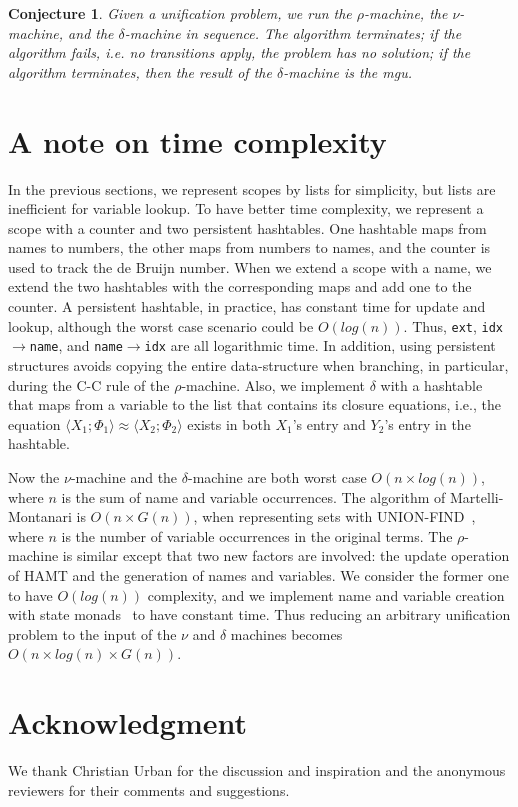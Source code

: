 \documentclass{easychair}
\newtheorem{conj}{Conjecture}[section]
\newcommand{\clos}[2] {
\langle #1; #2 \rangle
}
\newcommand{\aeq}[4] {
\clos{#1}{#2} \approx \clos{#3}{#4}
}
\newcommand*{\transname}[1]{\textsc{#1}}
\begin{document}
\begin{conj}\label{lemma:rmachine}
  Given a unification problem, we run the $\rho$-machine,
  the $\nu$-machine, and the $\delta$-machine in sequence.
  The algorithm terminates;
  if the algorithm fails, i.e. no transitions apply,
  the problem has no solution;
  if the algorithm terminates, then the result of the $\delta$-machine
  is the mgu.
\end{conj}

\section{A note on time complexity}
\label{efficiency}

In the previous sections, we represent scopes by lists for simplicity,
but lists are inefficient for variable lookup. To have better time
complexity, we represent a scope with a counter and two persistent
hashtables. One
hashtable maps from names to numbers, the other maps from numbers to
names, and the counter is used to track the de Bruijn number. When we
extend a scope with a name, we extend the two hashtables with the
corresponding maps and add one to the counter. A persistent
hashtable, in practice, has constant time for update and lookup,
although the worst case scenario could be $O(log(n))$. Thus,
\texttt{ext}, \texttt{idx$\rightarrow$name}, and
\texttt{name$\rightarrow$idx} are all logarithmic time. In addition,
using persistent structures avoids copying the entire data-structure
when branching, in particular, during the \transname{C-C} rule of
the $\rho$-machine.
Also, we implement $\delta$ with a hashtable that maps from a variable to
the list that contains its closure equations,
i.e., the equation $\aeq{X_1}{\Phi_1}{X_2}{\Phi_2}$
exists in both $X_1$'s entry and $Y_2$'s entry in the hashtable.

Now the $\nu$-machine and the
$\delta$-machine are both worst case $O(n \times log(n))$,
where $n$ is the sum of name and variable occurrences.
The algorithm of Martelli-Montanari is $O(n \times G(n))$, when
representing sets with UNION-FIND~\citep{tarjan_efficiency_1975}, where
$n$ is the number of variable occurrences in the original terms. The
$\rho$-machine is similar except that two new factors are involved:
the update operation of HAMT and the generation of names and
variables. We consider the former one to have $O(log(n))$ complexity,
and we implement name and variable creation with state
monads~\citep{moggi_notions_1991} to have
constant time. Thus reducing an arbitrary unification problem to the
input of the $\nu$ and $\delta$ machines becomes $O(n \times log(n) \times
G(n))$.

\section*{Acknowledgment}
We thank Christian Urban for the discussion and inspiration
and the anonymous reviewers for their comments and suggestions.


\end{document}
